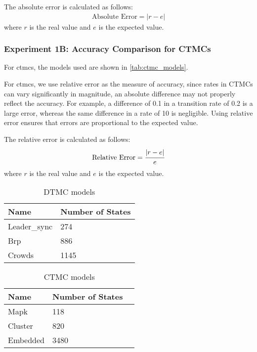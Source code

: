 The absolute error is calculated as follows:
\begin{equation}
    \begin{aligned}
        \text{Absolute Error} = |r - e|
    \end{aligned}
\end{equation}
where $r$ is the real value and $e$ is the expected value.

\subsubsection{Experiment 1B: Accuracy Comparison for CTMCs}
For \glspl{ctmc}, the models used are shown in \autoref{tab:ctmc_models}.

For \glspl{ctmc}, we use relative error as the measure of accuracy, since rates in CTMCs can vary significantly in magnitude, an absolute difference may not properly reflect the accuracy.
For example, a difference of 0.1 in a transition rate of 0.2 is a large error, whereas the same difference in a rate of 10 is negligible.
Using relative error ensures that errors are proportional to the expected value.

The relative error is calculated as follows:
\begin{equation}
    \begin{aligned}
        \text{Relative Error} = \cfrac{|r - e|}{e}
    \end{aligned}
\end{equation}
where $r$ is the real value and $e$ is the expected value.

\begin{table}[!htb]
    \centering
    \caption{DTMC models}
    \label{tab:dtmc_models}
    \begin{tabular}{ll}
        \toprule
        Name         & Number of States \\
        \midrule
        Leader\_sync & 274              \\
        Brp          & 886              \\
        Crowds       & 1145             \\
        \bottomrule
    \end{tabular}
\end{table}

\begin{table}[!htb]
    \centering
    \caption{CTMC models}
    \label{tab:ctmc_models}
    \begin{tabular}{lll}
        \toprule
        Name     & Number of States \\
        \midrule
        Mapk     & 118              \\
        Cluster  & 820              \\
        Embedded & 3480             \\
        \bottomrule
    \end{tabular}
\end{table}



